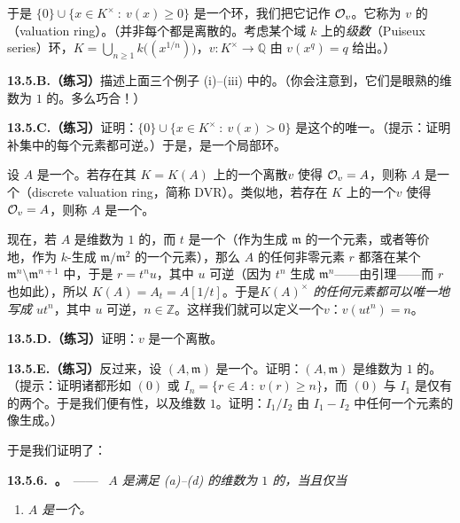 于是 $\{0\}\cup\{x\in K^{\times}\ :\ v(x)\ge0\}$ 是一个环，我们把它记作 $\mathcal{O}_v$。它称为 $v$ 的\textbf{\trValuationRing}（valuation ring）。（并非每个\trValuation{}都是离散的。考虑某个域 $k$ 上的\emph{\trPuiseux{}级数}（Puiseux series）环，$K=\bigcup_{n\ge1}k\bigl((x^{1/n})\bigr)$，\trValuation $v\colon K^{\times}\to\mathbb{Q}$ 由 $v(x^q)=q$ 给出。）

\textbf{13.5.B.（练习）}\quad 描述上面三个例子 (i)--(iii) 中的\trValuationRing。（你会注意到，它们是眼熟的维数为 $1$ 的\trNoetherian\trLocalRing。多么巧合！）

\textbf{13.5.C.（练习）}\quad 证明：$\{0\}\cup\{x\in K^{\times}\ :\ v(x)>0\}$ 是这个\trValuationRing{}的唯一\trMaximalIdeal。（提示：证明补集中的每个元素都可逆。）于是，\trValuationRing{}是一个局部环。

设 $A$ 是一个\trIntegralDomain。若存在其\trFractionField{} $K=K(A)$ 上的一个离散\trValuation $v$ 使得 $\mathcal{O}_v=A$，则称 $A$ 是一个\textbf{\trDVR}（discrete valuation ring，简称 DVR）。类似地，若存在 $K$ 上的一个\trValuation $v$ 使得 $\mathcal{O}_v=A$，则称 $A$ 是一个\textbf{\trValuationRing}。

现在，若 $A$ 是维数为 $1$ 的\trRegular\trLocalRing，而 $t$ 是一个\trUniformizer（作为\trIdeal{}生成 $\mathfrak{m}$ 的一个元素，或者等价地，作为 $k$-\trVectorSpace{}生成 $\mathfrak{m}/\mathfrak{m}^2$ 的一个元素），那么 $A$ 的任何非零元素 $r$ 都落在某个 $\mathfrak{m}^n\setminus\mathfrak{m}^{n+1}$ 中，于是 $r=t^nu$，其中 $u$ 可逆（因为 $t^n$ 生成 $\mathfrak{m}^n$——由\trNakayama{}引理——而 $r$ 也如此），所以 $K(A)=A_t=A[1/t]$。于是\emph{$K(A)^{\times}$ 的任何元素都可以唯一地写成 $ut^n$}，其中 $u$ 可逆，$n\in\mathbb{Z}$。这样我们就可以定义一个\trValuation $v$：$v(ut^n)=n$。

\textbf{13.5.D.（练习）}\quad 证明：$v$ 是一个离散\trValuation。

\textbf{13.5.E.（练习）}\quad 反过来，设 $(A,\mathfrak{m})$ 是一个\trDVR。证明：$(A,\mathfrak{m})$ 是维数为 $1$ 的\trRegular\trLocalRing。（提示：证明诸\trIdeal{}都形如 $(0)$ 或 $I_n=\{r\in A\ :\ v(r)\ge n\}$，而 $(0)$ 与 $I_1$ 是仅有的两个\trPrimeIdeal。于是我们便有\trNoetherian{}性，以及维数 $1$。证明：$I_1/I_2$ 由 $I_1-I_2$ 中任何一个元素的像生成。）

于是我们证明了：

\textbf{13.5.6.\ \trhTheorem{}。}\ ——\ \emph{\trIntegralDomain{} $A$ 是满足 (a)--(d) 的维数为 $1$ 的\trNoetherian\trLocalRing，当且仅当}
\begin{enumerate}[label=(\alph*),start=5]
\item \emph{$A$ 是一个\trDVR。}
\end{enumerate}

